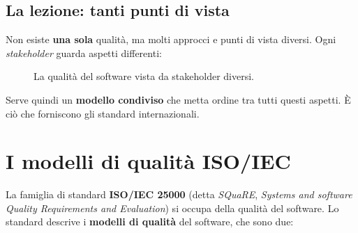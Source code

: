 \subsection{La lezione: tanti punti di vista}

Non esiste \textbf{una sola} qualità, ma molti approcci e punti di vista diversi. Ogni \textit{stakeholder} guarda aspetti differenti:

\begin{figure}[H]
\centering
{}
\caption{La qualità del software vista da stakeholder diversi.}
\end{figure}

Serve quindi un \textbf{modello condiviso} che metta ordine tra tutti questi aspetti. È ciò che forniscono gli standard internazionali.

\section{I modelli di qualità ISO/IEC}

La famiglia di standard \textbf{ISO/IEC 25000} (detta \textit{SQuaRE}, \textit{Systems and software Quality Requirements and Evaluation})
si occupa della qualità del software. Lo standard  descrive i \textbf{modelli di qualità} del software, che sono due:

